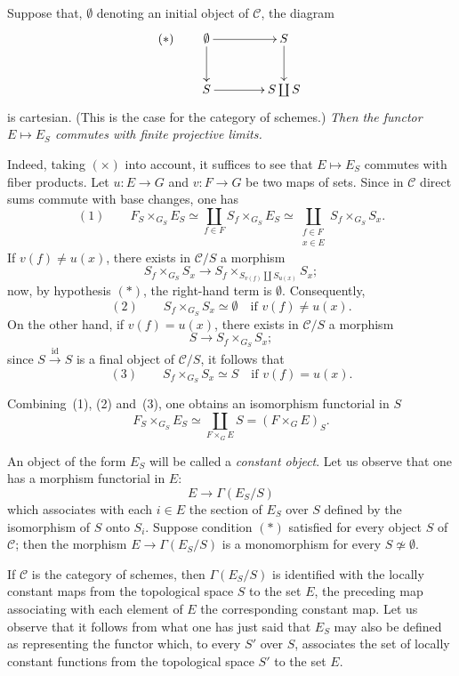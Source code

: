 Suppose that, \(\emptyset\) denoting an initial object of \(\mathcal{C}\), the diagram
\[
(\ast)\qquad
\xymatrix@C=4em@R=2.6em{
\emptyset \ar[r] \ar[d] & S \ar[d] \\
S \ar[r] & S\coprod S
}
\]
is cartesian.
(This is the case for the category of schemes.)
\emph{Then the functor \(E\mapsto E_S\) commutes with finite projective limits.}

Indeed, taking \((\times)\) into account, it suffices to see that \(E\mapsto E_S\) commutes with fiber products. Let \(u\colon E\to G\) and \(v\colon F\to G\) be two maps of sets. Since in \(\mathcal{C}\) direct sums commute with base changes, one has
\[
(1)\qquad
F_S\times_{G_S} E_S
\simeq\coprod_{f\in F} S_f\times_{G_S} E_S
\simeq\coprod_{\substack{f\in F\\ x\in E}} S_f\times_{G_S} S_x.
\]
If \(v(f)\neq u(x)\), there exists in \(\mathcal{C}/S\) a morphism
\[
S_f\times_{G_S} S_x\longrightarrow
S_f\times_{S_{v(f)}\coprod S_{u(x)}} S_x;
\]
now, by hypothesis \((\ast)\), the right-hand term is \(\emptyset\). Consequently,
\[
(2)\qquad
S_f\times_{G_S} S_x\simeq\emptyset
\quad\text{if }v(f)\neq u(x).
\]
On the other hand, if \(v(f)=u(x)\), there exists in \(\mathcal{C}/S\) a morphism
\[
S\longrightarrow S_f\times_{G_S} S_x;
\]
since \(S\xrightarrow{\mathrm{id}}S\) is a final object of \(\mathcal{C}/S\), it follows that
\[
(3)\qquad
S_f\times_{G_S} S_x\simeq S
\quad\text{if }v(f)=u(x).
\]

Combining~(1), (2) and~(3), one obtains an isomorphism functorial in \(S\)
\[
F_S\times_{G_S} E_S
\simeq\coprod_{F\times_G E} S
=(F\times_G E)_S.
\]

An object of the form \(E_S\) will be called a \emph{constant object}. Let us observe that one has a morphism functorial in \(E\):
\[
E\longrightarrow\Gamma(E_S/S)
\]
which associates with each \(i\in E\) the section of \(E_S\) over \(S\) defined by the isomorphism of \(S\) onto \(S_i\). Suppose condition \((\ast)\) satisfied for every object \(S\) of \(\mathcal{C}\); then the morphism \(E\to\Gamma(E_S/S)\) is a monomorphism for every \(S\not\simeq\emptyset\).

If \(\mathcal{C}\) is the category of schemes, then \(\Gamma(E_S/S)\) is identified with the locally constant maps from the topological space \(S\) to the set \(E\), the preceding map associating with each element of \(E\) the corresponding constant map. Let us observe that it follows from what one has just said that \(E_S\) may also be defined as representing the functor which, to every \(S'\) over \(S\), associates the set of locally constant functions from the topological space \(S'\) to the set \(E\).

